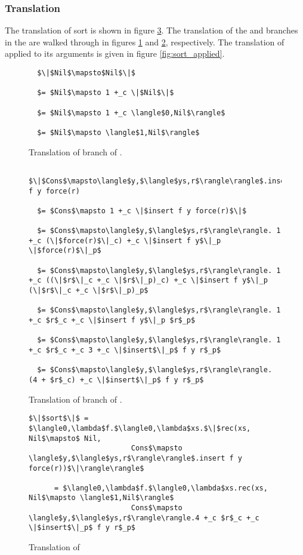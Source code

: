 \subsubsection{Translation}
The translation of sort is shown in figure \ref{fig:sort}.  The translation of
the  and  branches in the  are walked through in figures
\ref{fig:sort_nil} and \ref{fig:sort_cons}, respectively.  The translation of
 applied to its arguments is given in figure \ref{fig:sort_applied}.
%
\begin{figure}[H]
  \caption{Translation of  branch of .}
  \label{fig:sort_nil}
  \begin{lstlisting}
  $\|$Nil$\mapsto$Nil$\|$

  $= $Nil$\mapsto 1 +_c \|$Nil$\|$

  $= $Nil$\mapsto 1 +_c \langle$0,Nil$\rangle$

  $= $Nil$\mapsto \langle$1,Nil$\rangle$
  \end{lstlisting}
\end{figure}
%
\begin{figure}[H]
  \caption{Translation of  branch of .}
  \label{fig:sort_cons}
  \begin{lstlisting}
  $\|$Cons$\mapsto\langle$y,$\langle$ys,r$\rangle\rangle$.insert f y force(r)

  $= $Cons$\mapsto 1 +_c \|$insert f y force(r)$\|$

  $= $Cons$\mapsto\langle$y,$\langle$ys,r$\rangle\rangle. 1 +_c (\|$force(r)$\|_c) +_c \|$insert f y$\|_p \|$force(r)$\|_p$

  $= $Cons$\mapsto\langle$y,$\langle$ys,r$\rangle\rangle. 1 +_c ((\|$r$\|_c +_c \|$r$\|_p)_c) +_c \|$insert f y$\|_p (\|$r$\|_c +_c \|$r$\|_p)_p$

  $= $Cons$\mapsto\langle$y,$\langle$ys,r$\rangle\rangle. 1 +_c $r$_c +_c \|$insert f y$\|_p $r$_p$

  $= $Cons$\mapsto\langle$y,$\langle$ys,r$\rangle\rangle. 1 +_c $r$_c +_c 3 +_c \|$insert$\|_p$ f y r$_p$

  $= $Cons$\mapsto\langle$y,$\langle$ys,r$\rangle\rangle. (4 + $r$_c) +_c \|$insert$\|_p$ f y r$_p$

  \end{lstlisting}
\end{figure}
%
\begin{figure}[H]
\caption{Translation of }
\label{fig:sort}
\begin{lstlisting}
$\|$sort$\|$ = $\langle0,\lambda$f.$\langle0,\lambda$xs.$\|$rec(xs, Nil$\mapsto$ Nil,
                        Cons$\mapsto \langle$y,$\langle$ys,r$\rangle\rangle$.insert f y force(r))$\|\rangle\rangle$

      = $\langle0,\lambda$f.$\langle0,\lambda$xs.rec(xs, Nil$\mapsto \langle$1,Nil$\rangle$
                        Cons$\mapsto \langle$y,$\langle$ys,r$\rangle\rangle.4 +_c $r$_c +_c \|$insert$\|_p$ f y r$_p$
\end{lstlisting}
\end{figure}
